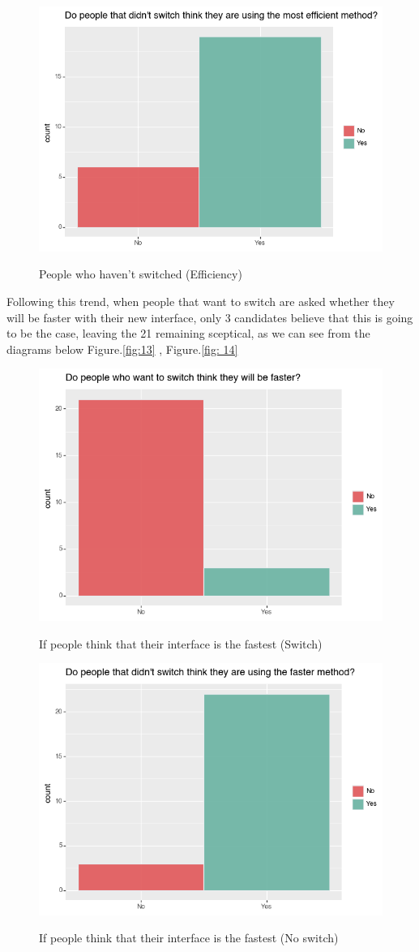 \documentclass[]{report}
\begin{document}
		\begin{figure}[H]
			\centering
			\includegraphics[width=0.75\linewidth]{EfficientNoSwitch}\\
			\caption{People who haven't switched (Efficiency)}
			\label{fig: 10}
		\end{figure}
		Following this trend, when people that want to switch are asked whether they will be faster with their new interface,  only 3 candidates believe that this is going to be the case, leaving the 21 remaining sceptical, as we can see from the diagrams below Figure.\ref{fig:13} , Figure.\ref{fig: 14}
		\begin{figure}[H]
			\centering
			\includegraphics[width=0.75\linewidth]{SpeedSwitch}\\
			\caption{If people think that their interface is the fastest (Switch)}
			\label{fig:11}
		\end{figure}
		\begin{figure}[H]
			\centering
			\includegraphics[width=0.75\linewidth]{SpeedNoSwitch}\\
			\caption{If people think that their interface is the fastest (No switch)}
			\label{fig: 12}
		\end{figure}
		
\end{document}
